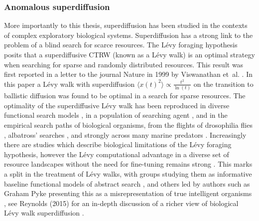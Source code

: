 \subsubsection*{Anomalous superdiffusion}
More importantly to this thesis, superdiffusion has been studied in the contexts of complex exploratory biological systems. Superdiffusion has a strong link to the problem of a blind search for scarce resources. The Lévy foraging hypothesis posits that a superdiffusive CTRW (known as a Lévy walk) is an optimal strategy when searching for sparse and randomly distributed resources. This result was first reported in a letter to the journal Nature in 1999 by Viswanathan et~al. \cite{viswanathan_optimizing_1999}. In this paper a Lévy walk with superdiffusion $\langle x(t) ^2 \rangle \propto \frac{t^2}{\ln(t)}$ on the transition to ballistic diffusion was found to be optimal in a search for sparse resources. The optimality of the superdiffusive Lévy walk has been reproduced in diverse functional search models \cite{humphries_optimal_2014, campeau_evolutionary_2022, sims_optimal_2019}, in a population of searching agent \cite{clementi_search_2021}, and in the empirical search paths of biological organisms, from the flights of drosophilia flies \cite{sims_optimal_2019, reynolds_free-flight_2007}, albatross' searches \cite{focardi_levy_2014, humphries_new_2013}, and strongly across many marine predators \cite{sims_scaling_2008, humphries_environmental_2010}. Increasingly there are studies which describe biological limitations of the Lévy foraging hypothesis, however the Lévy computational advantage in a diverse set of resource landscapes without the need for fine-tuning remains strong \cite{humphries_optimal_2014, campeau_evolutionary_2022}. This marks a split in the treatment of Lévy walks, with groups studying them as informative baseline functional models of abstract search \cite{viswanathan_optimizing_1999, gautestad_levy_2013, humphries_optimal_2014, clementi_search_2021}, and others led by authors such as Graham Pyke presenting this as a misrepresentation of true intelligent organisms \cite{pyke_levy_2026, pyke_understanding_2015, benhamou_ultimate_2015}, see Reynolds (2015) for an in-depth discussion of a richer view of biological Lévy walk superdiffusion \cite{reynolds_liberating_2015}.\\

